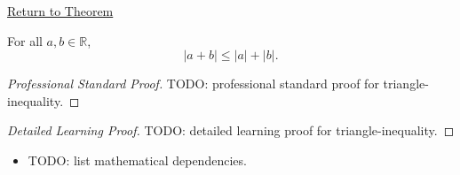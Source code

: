 \newpage
{}
\label{prf:triangle-inequality}

\begin{remark*}[Return]
\hyperref[thm:triangle-inequality]{Return to Theorem}
\end{remark*}

\begin{theorem*}
For all $a, b \in \mathbb{R}$,
\[
  \lvert a + b \rvert \le \lvert a \rvert + \lvert b \rvert.
\]
\end{theorem*}

\begin{proof}[Professional Standard Proof]
\LRAProofBodyStart
TODO: professional standard proof for triangle-inequality.
\end{proof}

\begin{proof}[Detailed Learning Proof]
\LRAProofBodyStart
TODO: detailed learning proof for triangle-inequality.
\end{proof}

\begin{remark*}
\end{remark*}

\begin{dependencies}
\begin{itemize}
  \item TODO: list mathematical dependencies.
\end{itemize}
\end{dependencies}

\clearpage
